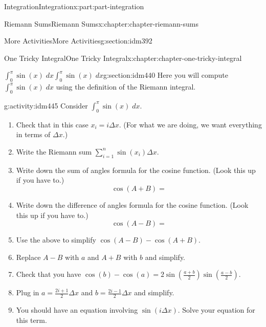 \documentclass[oneside,10pt,]{book}
\begin{document}
\begin{partptx}{Integration}{}{Integration}{}{}{x:part:part-integration}
\begin{chapterptx}{Riemann Sums}{}{Riemann Sums}{}{}{x:chapter:chapter-riemann-sums}
\begin{sectionptx}{More Activities}{}{More Activities}{}{}{g:section:idm392}
\end{sectionptx}
\end{chapterptx}
%
\typeout{************************************************}
\typeout{************************************************}
%
\begin{chapterptx}{One Tricky Integral}{}{One Tricky Integral}{}{}{x:chapter:chapter-one-tricky-integral}
%
%
\typeout{************************************************}
\typeout{************************************************}
%
\begin{sectionptx}{\(\displaystyle \int_0^\pi \sin(x) \; dx\)}{}{\(\displaystyle \int_0^\pi \sin(x) \; dx\)}{}{}{g:section:idm440}
Here you will compute \(\displaystyle \int_0^\pi \sin(x) \; dx\) using the definition of the Riemann integral.%
\begin{activity}{}{g:activity:idm445}%
Consider \(\displaystyle \int_{0}^\pi \sin(x) \; dx\).%
\begin{enumerate}[font=\bfseries,label=(\alph*),ref=\alph*]
\item{}Check that in this case \(x_i = i \Delta x\). (For what we are doing, we want everything in terms of \(\Delta x\).)%
\item{}Write the Riemann sum \(\displaystyle \sum_{i=1}^n \sin(x_i) \Delta x\).%
\item{}Write down the sum of angles formula for the cosine function. (Look this up if you have to.)%
\begin{equation*}
\cos(A+B) = 
\end{equation*}
%
\item{}Write down the difference of angles formula for the cosine function. (Look this up if you have to.)%
\begin{equation*}
\cos(A-B) = 
\end{equation*}
%
\item{}Use the above to simplify \(\cos(A-B) - \cos(A+B)\).%
\item{}Replace \(A-B\) with \(a\) and \(A+B\) with \(b\) and simplify.%
\item{}Check that you have \(\displaystyle \cos(b) - \cos(a) = 2 \sin \left(\frac{a+b}{2}\right) \sin\left(\frac{a-b}{2}\right)\).%
\item{}Plug in \(\displaystyle a = \frac{2i+1}{2} \Delta x\) and \(\displaystyle b = \frac{2i-1}{2}\Delta x\) and simplify.%
\item{}You should have an equation involving \(\sin(i \Delta x)\). Solve your equation for this term.%

\end{enumerate}
\end{activity}
\end{sectionptx}
\end{chapterptx}
\end{partptx}
\end{document}
